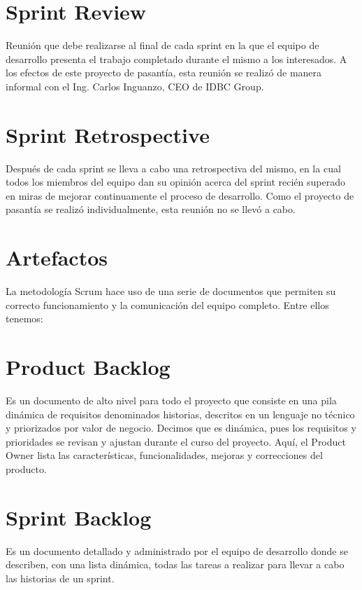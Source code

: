 \section{Sprint Review}
Reunión que debe realizarse al final de cada sprint en la que el equipo de desarrollo presenta el trabajo completado durante el mismo a los interesados.
A los efectos de este proyecto de pasantía, esta reunión se realizó de manera informal con el Ing. Carlos Inguanzo, CEO de IDBC Group.

\section{Sprint Retrospective}
Después de cada sprint se lleva a cabo una retrospectiva del mismo, en la cual todos los miembros del equipo dan su opinión acerca del sprint recién superado en miras de mejorar continuamente el proceso de desarrollo. Como el proyecto de pasantía se realizó individualmente, esta reunión no se llevó a cabo.

\section{Artefactos}
La metodología Scrum hace uso de una serie de documentos que permiten su correcto funcionamiento y la comunicación del equipo completo. Entre ellos tenemos:

\section{Product Backlog}
Es un documento de alto nivel para todo el proyecto que consiste en una pila dinámica de requisitos denominados historias, descritos en un lenguaje no técnico y priorizados por valor de negocio. Decimos que es dinámica, pues los requisitos y prioridades se revisan y ajustan durante el curso del proyecto. Aquí, el Product Owner lista las características, funcionalidades, mejoras y correcciones del producto.

\section{Sprint Backlog}
Es un documento detallado y administrado por el equipo de desarrollo donde se describen, con una lista dinámica, todas las tareas a realizar para llevar a cabo las historias de un sprint.

